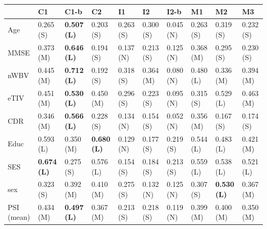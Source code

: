 \begin{tabular}{llllllllll}
\toprule
 & C1 & C1-b & C2 & I1 & I2 & I2-b & M1 & M2 & M3 \\
\midrule
Age & 0.265 (S) & \textbf{0.507 (L)} & 0.203 (S) & 0.263 (S) & 0.300 (S) & 0.045 (N) & 0.263 (S) & 0.319 (S) & 0.232 (S) \\
MMSE & 0.373 (M) & \textbf{0.646 (L)} & 0.194 (S) & 0.137 (N) & 0.213 (S) & 0.125 (N) & 0.368 (M) & 0.295 (S) & 0.230 (S) \\
nWBV & 0.445 (M) & \textbf{0.712 (L)} & 0.192 (S) & 0.318 (S) & 0.364 (M) & 0.080 (N) & 0.480 (L) & 0.336 (M) & 0.394 (M) \\
eTIV & 0.451 (M) & \textbf{0.530 (L)} & 0.450 (M) & 0.296 (S) & 0.223 (S) & 0.095 (N) & 0.315 (S) & 0.529 (L) & 0.463 (M) \\
CDR & 0.346 (M) & \textbf{0.566 (L)} & 0.228 (S) & 0.134 (N) & 0.154 (S) & 0.052 (N) & 0.356 (M) & 0.167 (S) & 0.174 (S) \\
Educ & 0.593 (L) & 0.350 (M) & \textbf{0.680 (L)} & 0.129 (N) & 0.177 (S) & 0.219 (S) & 0.544 (L) & 0.483 (L) & 0.421 (M) \\
SES & \textbf{0.674 (L)} & 0.275 (S) & 0.576 (L) & 0.154 (S) & 0.184 (S) & 0.213 (S) & 0.559 (L) & 0.538 (L) & 0.521 (L) \\
sex & 0.323 (S) & 0.392 (M) & 0.410 (M) & 0.275 (S) & 0.132 (N) & 0.125 (N) & 0.307 (S) & \textbf{0.530 (L)} & 0.367 (M) \\
PSI (mean) & 0.434 (M) & \textbf{0.497 (L)} & 0.367 (M) & 0.213 (S) & 0.218 (S) & 0.119 (N) & 0.399 (M) & 0.400 (M) & 0.350 (M) \\
\bottomrule
\end{tabular}
